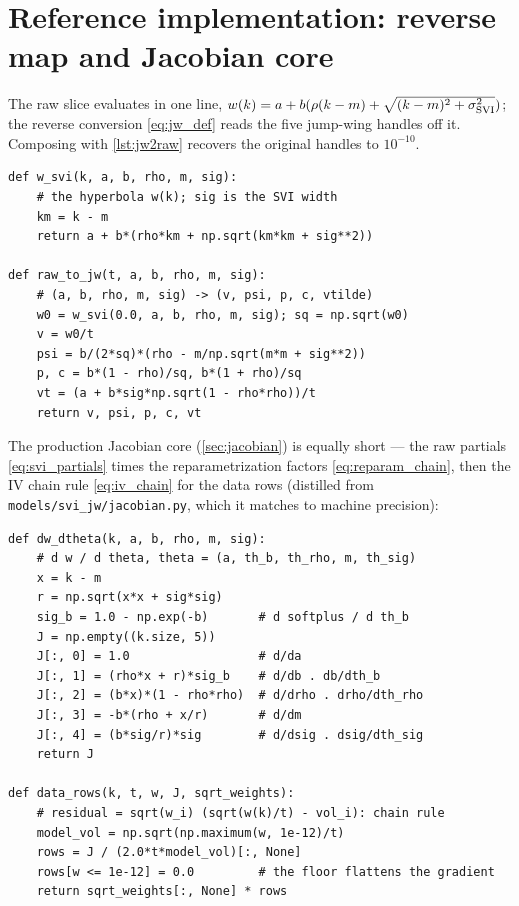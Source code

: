 \documentclass[11pt]{article}
\begin{document}
\section{Reference implementation: reverse map and Jacobian core}
\label{app:ref}

The raw slice evaluates in one line,
$w(k)=a+b(\rho(k-m)+\sqrt{(k-m)^2+\sigma_{\mathrm{SVI}}^2})$; the reverse conversion
\eqref{eq:jw_def} reads the five jump-wing handles off it. Composing with
\cref{lst:jw2raw} recovers the original handles to $10^{-10}$.

\begin{lstlisting}[caption={The reverse map raw $\to$ SVI-JW --- equations
\eqref{eq:jw_def}. The backend ships only the forward converter; this reverse
listing is the one the figure generator runs.}]
def w_svi(k, a, b, rho, m, sig):
    # the hyperbola w(k); sig is the SVI width
    km = k - m
    return a + b*(rho*km + np.sqrt(km*km + sig**2))

def raw_to_jw(t, a, b, rho, m, sig):
    # (a, b, rho, m, sig) -> (v, psi, p, c, vtilde)
    w0 = w_svi(0.0, a, b, rho, m, sig); sq = np.sqrt(w0)
    v = w0/t
    psi = b/(2*sq)*(rho - m/np.sqrt(m*m + sig**2))
    p, c = b*(1 - rho)/sq, b*(1 + rho)/sq
    vt = (a + b*sig*np.sqrt(1 - rho*rho))/t
    return v, psi, p, c, vt
\end{lstlisting}

The production Jacobian core (\cref{sec:jacobian}) is equally short --- the
raw partials \eqref{eq:svi_partials} times the reparametrization factors
\eqref{eq:reparam_chain}, then the IV chain rule \eqref{eq:iv_chain} for the
data rows (distilled from \texttt{models/svi\_jw/jacobian.py}, which it
matches to machine precision):

\begin{lstlisting}[caption={The analytic Jacobian's core: $\dd w/\dd\theta$
after the chain rule, and the IV data rows.}]
def dw_dtheta(k, a, b, rho, m, sig):
    # d w / d theta, theta = (a, th_b, th_rho, m, th_sig)
    x = k - m
    r = np.sqrt(x*x + sig*sig)
    sig_b = 1.0 - np.exp(-b)       # d softplus / d th_b
    J = np.empty((k.size, 5))
    J[:, 0] = 1.0                  # d/da
    J[:, 1] = (rho*x + r)*sig_b    # d/db . db/dth_b
    J[:, 2] = (b*x)*(1 - rho*rho)  # d/drho . drho/dth_rho
    J[:, 3] = -b*(rho + x/r)       # d/dm
    J[:, 4] = (b*sig/r)*sig        # d/dsig . dsig/dth_sig
    return J

def data_rows(k, t, w, J, sqrt_weights):
    # residual = sqrt(w_i) (sqrt(w(k)/t) - vol_i): chain rule
    model_vol = np.sqrt(np.maximum(w, 1e-12)/t)
    rows = J / (2.0*t*model_vol)[:, None]
    rows[w <= 1e-12] = 0.0         # the floor flattens the gradient
    return sqrt_weights[:, None] * rows
\end{lstlisting}
\end{document}
